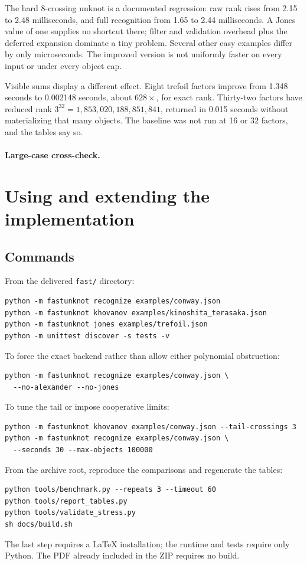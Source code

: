 \documentclass[11pt]{article}
\theoremstyle{remark}\newtheorem{remark}[theorem]{Remark}
\begin{document}
The hard 8-crossing unknot is a documented regression: raw rank rises from
2.15 to 2.48 milliseconds, and full recognition from 1.65 to 2.44
milliseconds. A Jones value of one supplies no shortcut there; filter and
validation overhead plus the deferred expansion dominate a tiny problem.
Several other easy examples differ by only microseconds. The improved
version is not uniformly faster on every input or under every object cap.

Visible sums display a different effect. Eight trefoil factors improve
from 1.348 seconds to 0.002148 seconds, about $628\times$, for exact rank.
Thirty-two factors have reduced rank
$3^{32}=1{,}853{,}020{,}188{,}851{,}841$, returned in 0.015 seconds without
materializing that many objects. The baseline was not run at 16 or 32
factors, and the tables say so.

\paragraph{Large-case cross-check.}


\section{Using and extending the implementation}
\subsection{Commands}
From the delivered \texttt{fast/} directory:
\begin{lstlisting}
python -m fastunknot recognize examples/conway.json
python -m fastunknot khovanov examples/kinoshita_terasaka.json
python -m fastunknot jones examples/trefoil.json
python -m unittest discover -s tests -v
\end{lstlisting}
To force the exact backend rather than allow either polynomial obstruction:
\begin{lstlisting}
python -m fastunknot recognize examples/conway.json \
  --no-alexander --no-jones
\end{lstlisting}
To tune the tail or impose cooperative limits:
\begin{lstlisting}
python -m fastunknot khovanov examples/conway.json --tail-crossings 3
python -m fastunknot recognize examples/conway.json \
  --seconds 30 --max-objects 100000
\end{lstlisting}
From the archive root, reproduce the comparisons and regenerate the tables:
\begin{lstlisting}
python tools/benchmark.py --repeats 3 --timeout 60
python tools/report_tables.py
python tools/validate_stress.py
sh docs/build.sh
\end{lstlisting}
The last step requires a LaTeX installation; the runtime and tests require
only Python. The PDF already included in the ZIP requires no build.
\end{document}
